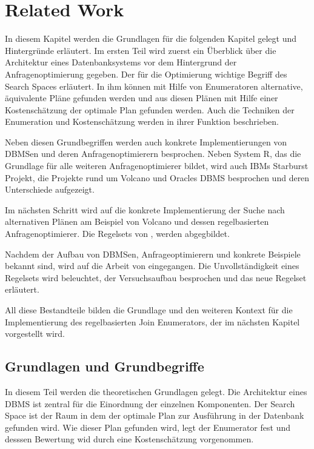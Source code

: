 \chapter{Related Work}


In diesem Kapitel werden die Grundlagen für die folgenden Kapitel gelegt und Hintergründe erläutert. Im ersten Teil wird zuerst ein Überblick über die Architektur eines Datenbanksystems vor dem Hintergrund der Anfragenoptimierung gegeben. Der für die Optimierung wichtige Begriff des Search Spaces erläutert. In ihm können mit Hilfe von Enumeratoren alternative, äquivalente Pläne gefunden werden und aus diesen Plänen mit Hilfe einer Kostenschätzung der optimale Plan gefunden werden. Auch die Techniken der Enumeration und Kostenschätzung werden in ihrer Funktion beschrieben.

Neben diesen Grundbegriffen werden auch konkrete Implementierungen von DBMSen und deren Anfragenoptimierern besprochen. Neben System R, das die Grundlage für alle weiteren Anfragenoptimierer bildet, wird auch IBMs Starburst Projekt, die Projekte rund um Volcano und Oracles DBMS besprochen und deren Unterschiede aufgezeigt.

Im nächsten Schritt wird auf die konkrete Implementierung der Suche nach alternativen Plänen am Beispiel von Volcano und dessen regelbasierten Anfragenoptimierer. Die Regelsets von \cite{pellenkoft1997complexity}, \cite{pellenkoft1997duplicate} werden abgegbildet.

Nachdem der Aufbau von DBMSen, Anfrageoptimierern und konkrete Beispiele bekannt sind, wird auf die Arbeit von \cite{indien} eingegangen. Die Unvollständigkeit eines Regelsets wird beleuchtet, der Versuchsaufbau besprochen und das neue Regelset erläutert.

All diese Bestandteile bilden die Grundlage und den weiteren Kontext für die Implementierung des regelbasierten Join Enumerators, der im nächsten Kapitel vorgestellt wird.






\section{Grundlagen und Grundbegriffe}

In diesem Teil werden die theoretischen Grundlagen gelegt. Die Architektur eines DBMS ist zentral für die Einordnung der einzelnen Komponenten. Der Search Space ist der Raum in dem der optimale Plan zur Ausführung in der Datenbank gefunden wird. Wie dieser Plan gefunden wird, legt der Enumerator fest und desssen Bewertung wid durch eine Kostenschätzung vorgenommen.


